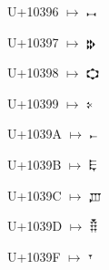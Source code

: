 {\noindent U+10396 $\mapsto$ {\ugfont 𐎖}\par
\noindent U+10397 $\mapsto$ {\ugfont 𐎗}\par
\noindent U+10398 $\mapsto$ {\ugfont 𐎘}\par
\noindent U+10399 $\mapsto$ {\ugfont 𐎙}\par
\noindent U+1039A $\mapsto$ {\ugfont 𐎚}\par
\noindent U+1039B $\mapsto$ {\ugfont 𐎛}\par
\noindent U+1039C $\mapsto$ {\ugfont 𐎜}\par
\noindent U+1039D $\mapsto$ {\ugfont 𐎝}\par
\noindent U+1039F $\mapsto$ {\ugfont 𐎟}\par
}


\newcommand\ugshowplainlistun{%
\label{sec:listugun}
\noindent alpa $\mapsto$ {\ugfont 𐎀}\par
\noindent beta $\mapsto$ {\ugfont 𐎁}\par
\noindent gamla $\mapsto$ {\ugfont 𐎂}\par
\noindent kha $\mapsto$ {\ugfont 𐎃}\par
\noindent delta $\mapsto$ {\ugfont 𐎄}\par
\noindent ho $\mapsto$ {\ugfont 𐎅}\par
\noindent wo $\mapsto$ {\ugfont 𐎆}\par
\noindent zeta $\mapsto$ {\ugfont 𐎇}\par
\noindent hota $\mapsto$ {\ugfont 𐎈}\par
\noindent tet $\mapsto$ {\ugfont 𐎉}\par
\noindent yod $\mapsto$ {\ugfont 𐎊}\par
\noindent kaf $\mapsto$ {\ugfont 𐎋}\par
\noindent shin $\mapsto$ {\ugfont 𐎌}\par
\noindent lamda $\mapsto$ {\ugfont 𐎍}\par
\noindent mem $\mapsto$ {\ugfont 𐎎}\par
\noindent dhal $\mapsto$ {\ugfont 𐎏}\par
\noindent nun $\mapsto$ {\ugfont 𐎐}\par
\noindent zu $\mapsto$ {\ugfont 𐎑}\par
\noindent samka $\mapsto$ {\ugfont 𐎒}\par
}
